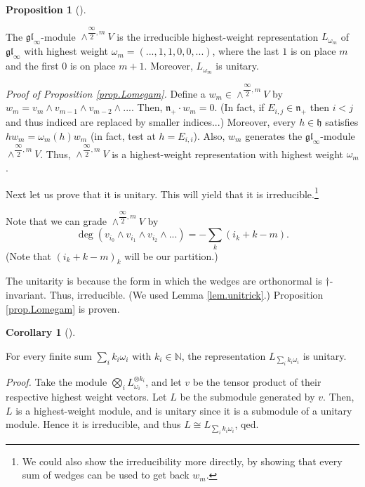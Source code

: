 \documentclass
[numbers=enddot,12pt,final,onecolumn,german,notitlepage]{scrartcl}%
\theoremstyle{definition}
\newtheorem{prop}[theo]{Proposition}
\newenvironment{proposition}[1][]
{\begin{prop}[#1]\begin{leftbar}}
{\end{leftbar}\end{prop}}
\newtheorem{coro}[theo]{Corollary}
\newenvironment{corollary}[1][]
{\begin{coro}[#1]\begin{leftbar}}
{\end{leftbar}\end{coro}}
\begin{document}
\begin{proposition}
\label{prop.Lomegam}The $\mathfrak{gl}_{\infty}$-module $\wedge^{\dfrac
{\infty}{2},m}V$ is the irreducible highest-weight representation
$L_{\omega_{m}}$ of $\mathfrak{gl}_{\infty}$ with highest weight $\omega
_{m}=\left(  ...,1,1,0,0,...\right)  $, where the last $1$ is on place $m$ and
the first $0$ is on place $m+1$. Moreover, $L_{\omega_{m}}$ is unitary.
\end{proposition}

\textit{Proof of Proposition \ref{prop.Lomegam}.} Define a $w_{m}\in
\wedge^{\dfrac{\infty}{2},m}V$ by $w_{m}=v_{m}\wedge v_{m-1}\wedge
v_{m-2}\wedge...$. Then, $\mathfrak{n}_{+}\cdot w_{m}=0$. (In fact, if
$E_{i,j}\in\mathfrak{n}_{+}$ then $i<j$ and thus indiced are replaced by
smaller indices...) Moreover, every $h\in\mathfrak{h}$ satisfies
$hw_{m}=\omega_{m}\left(  h\right)  w_{m}$ (in fact, test at $h=E_{i,i}$).
Also, $w_{m}$ generates the $\mathfrak{gl}_{\infty}$-module $\wedge
^{\dfrac{\infty}{2},m}V$. Thus, $\wedge^{\dfrac{\infty}{2},m}V$ is a
highest-weight representation with highest weight $\omega_{m}$.

Next let us prove that it is unitary. This will yield that it is
irreducible.\footnote{We could also show the irreducibility more directly, by
showing that every sum of wedges can be used to get back $w_{m}$.}

Note that we can grade $\wedge^{\dfrac{\infty}{2},m}V$ by%
\[
\deg\left(  v_{i_{0}}\wedge v_{i_{1}}\wedge v_{i_{2}}\wedge...\right)
=-\sum\limits_{k}\left(  i_{k}+k-m\right)  .
\]
(Note that $\left(  i_{k}+k-m\right)  _{k}$ will be our partition.)

The unitarity is because the form in which the wedges are orthonormal is
$\dag$-invariant. Thus, irreducible. (We used Lemma \ref{lem.unitrick}.)
Proposition \ref{prop.Lomegam} is proven.

\begin{corollary}
For every finite sum $\sum\limits_{i}k_{i}\omega_{i}$ with $k_{i}\in
\mathbb{N}$, the representation $L_{\sum\limits_{i}k_{i}\omega_{i}}$ is unitary.
\end{corollary}

\textit{Proof.} Take the module $\bigotimes\limits_{i}L_{\omega_{i}}^{\otimes
k_{i}}$, and let $v$ be the tensor product of their respective highest weight
vectors. Let $L$ be the submodule generated by $v$. Then, $L$ is a
highest-weight module, and is unitary since it is a submodule of a unitary
module. Hence it is irreducible, and thus $L\cong L_{\sum\limits_{i}%
k_{i}\omega_{i}}$, qed.
\end{document}
